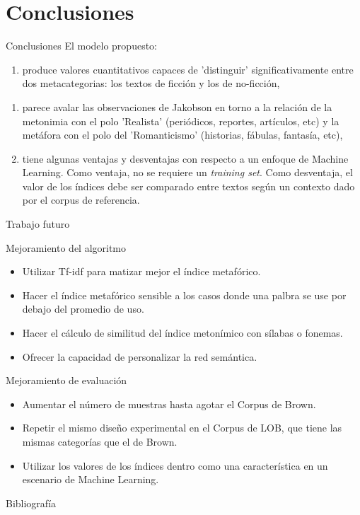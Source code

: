 \documentclass[presentation]{beamer}
\begin{document}
\section{Conclusiones}
\label{sec:orgdf031a4}
\begin{frame}[label={sec:org83c83dd}]{Conclusiones}
El modelo propuesto:

\begin{enumerate}
\item produce valores cuantitativos capaces de 'distinguir'
significativamente entre dos metacategorias: los textos de
ficción y los de no-ficción,
\end{enumerate}
\begin{enumerate}
\item parece avalar las observaciones de Jakobson en torno a la relación
de la metonimia con el polo 'Realista' (periódicos, reportes,
artículos, etc) y la metáfora con el polo del 'Romanticismo'
(historias, fábulas, fantasía, etc),

\item tiene algunas ventajas y desventajas con respecto a un enfoque de
Machine Learning. Como ventaja, no se requiere un \emph{training
set}. Como desventaja, el valor de los índices debe ser comparado
entre textos según un contexto dado por el corpus de referencia.
\end{enumerate}
\end{frame}

\begin{frame}[label={sec:org0df5c2f}]{Trabajo futuro}
\begin{block}{Mejoramiento del algoritmo}
\begin{itemize}
\item Utilizar Tf-idf para matizar mejor el índice metafórico.
\item Hacer el índice metafórico sensible a los casos donde una palbra se use por debajo del promedio de uso.
\item Hacer el cálculo de similitud del índice metonímico con sílabas o fonemas.
\item Ofrecer la capacidad de personalizar la red semántica.
\end{itemize}
\end{block}

\begin{block}{Mejoramiento de evaluación}
\begin{itemize}
\item Aumentar el número de muestras hasta agotar el Corpus de Brown.
\item Repetir el mismo diseño experimental en el Corpus de LOB, que tiene las mismas categorías que el de Brown.
\item Utilizar los valores de los índices dentro como una característica en un escenario de Machine Learning.
\end{itemize}
\end{block}
\end{frame}

\begin{frame}[label={sec:org78339f4}]{Bibliografía}


\end{frame}
\end{document}
